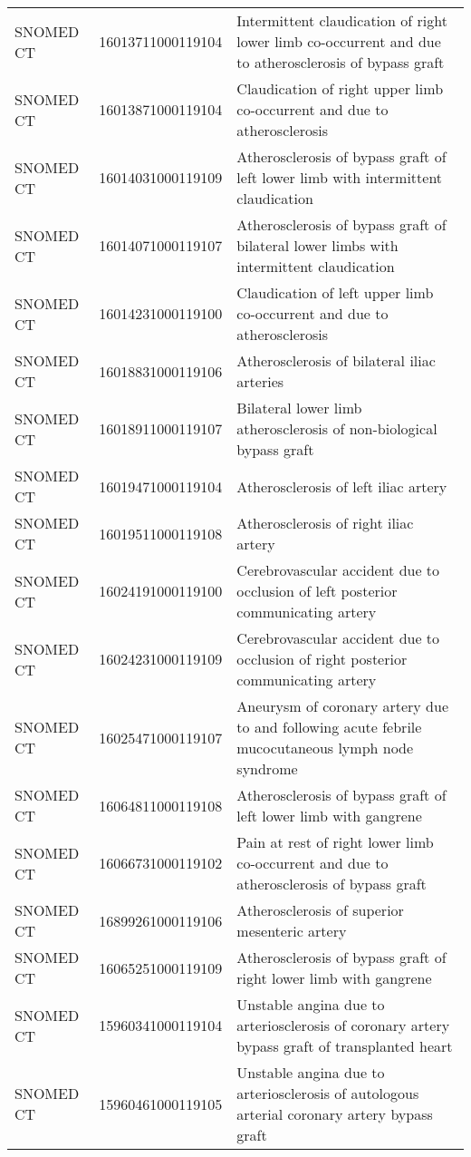 \begin{longtable}{p{}p{}p{}}
  SNOMED CT & 16013711000119104 & Intermittent claudication of right lower limb co-occurrent and due to atherosclerosis of bypass graft \\ 
  SNOMED CT & 16013871000119104 & Claudication of right upper limb co-occurrent and due to atherosclerosis \\ 
  SNOMED CT & 16014031000119109 & Atherosclerosis of bypass graft of left lower limb with intermittent claudication \\ 
  SNOMED CT & 16014071000119107 & Atherosclerosis of bypass graft of bilateral lower limbs with intermittent claudication \\ 
  SNOMED CT & 16014231000119100 & Claudication of left upper limb co-occurrent and due to atherosclerosis \\ 
  SNOMED CT & 16018831000119106 & Atherosclerosis of bilateral iliac arteries \\ 
  SNOMED CT & 16018911000119107 & Bilateral lower limb atherosclerosis of non-biological bypass graft \\ 
  SNOMED CT & 16019471000119104 & Atherosclerosis of left iliac artery \\ 
  SNOMED CT & 16019511000119108 & Atherosclerosis of right iliac artery \\ 
  SNOMED CT & 16024191000119100 & Cerebrovascular accident due to occlusion of left posterior communicating artery \\ 
  SNOMED CT & 16024231000119109 & Cerebrovascular accident due to occlusion of right posterior communicating artery \\ 
  SNOMED CT & 16025471000119107 & Aneurysm of coronary artery due to and following acute febrile mucocutaneous lymph node syndrome \\ 
  SNOMED CT & 16064811000119108 & Atherosclerosis of bypass graft of left lower limb with gangrene \\ 
  SNOMED CT & 16066731000119102 & Pain at rest of right lower limb co-occurrent and due to atherosclerosis of bypass graft \\ 
  SNOMED CT & 16899261000119106 & Atherosclerosis of superior mesenteric artery \\ 
  SNOMED CT & 16065251000119109 & Atherosclerosis of bypass graft of right lower limb with gangrene \\ 
  SNOMED CT & 15960341000119104 & Unstable angina due to arteriosclerosis of coronary artery bypass graft of transplanted heart \\ 
  SNOMED CT & 15960461000119105 & Unstable angina due to arteriosclerosis of autologous arterial coronary artery bypass graft \\ 

\end{longtable}
